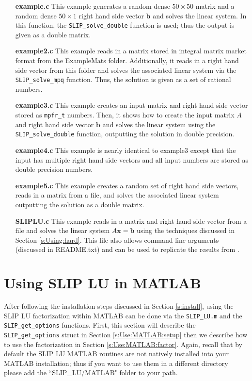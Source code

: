 \documentclass[12pt]{article}
\theoremstyle{definition}
\begin{document}
\begin{itemize}
\item [\bf example.c] This example generates a random dense $50 \times 50$ matrix and a random dense $50 \times 1$ right hand side vector $\mathbf{b}$ and solves the linear system. In this function, the \verb|SLIP_solve_double| function is used; thus the output is given as a double matrix.
\item [\bf example2.c] This example reads in a matrix stored in integral matrix market format from the ExampleMats folder. Additionally, it reads in a right hand side vector from this folder and solves the associated linear system via the \verb|SLIP_solve_mpq| function. Thus, the solution is given as a set of rational numbers.
\item [\bf example3.c] This example creates an input matrix and right hand side vector stored as \verb|mpfr_t| numbers. Then, it shows how to create the input matrix $A$ and right hand side vector $\mathbf{b}$ and solves the linear system using the \verb|SLIP_solve_double| function, outputting the solution in double precision.
\item [\bf example4.c] This example is nearly identical to example3 except that the input has multiple right hand side vectors and all input numbers are stored as double precision numbers.
\item [\bf example5.c] This example creates a random set of right hand side vectors, reads in a matrix from a file, and solves the associated linear system outputting the solution as a double matrix.
\item [\bf SLIPLU.c] This example reads in a matrix and right hand side vector from a file and solves the linear system $A \mathbf{x} = \mathbf{b}$ using the techniques discussed in Section \ref{s:Using:hard}. This file also allows command line arguments (discussed in README.txt) and can be used to replicate the results from \cite{lourenco2019exact}.
\end{itemize}

\newpage

\cprotect\section{Using SLIP LU in MATLAB} \label{s:Use:MATLAB}

After following the installation steps discussed in Section \ref{s:install}, using the SLIP LU factorization within MATLAB can be done via the \verb|SLIP_LU.m| and the \verb|SLIP_get_options| functions. First, this section will describe the \verb|SLIP_get_options| struct in Section \ref{s:Use:MATLAB:setup} then we describe how to use the factorization in Section \ref{s:Use:MATLAB:factor}. Again, recall that by default the SLIP LU MATLAB routines are not natively installed into your MATLAB installation; thus if you want to use them in a different directory please add the ``SLIP\_LU/MATLAB" folder to your path.
\end{document}
